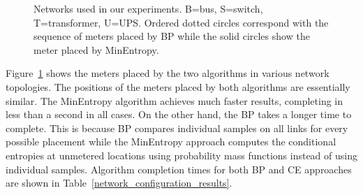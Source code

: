 \begin{figure}[!p]
\centering
{}

\begin{centering}
\end{centering}

\begin{centering}
\end{centering}

\begin{centering}
\end{centering}

\caption{Networks used in our experiments. B=bus, S=switch, T=transformer,
U=UPS. Ordered dotted circles correspond with the sequence of meters
placed by BP while the solid circles show the meter placed by MinEntropy.} 
\label{NetworkDiagrams}
\end{figure}

Figure~\ref{NetworkDiagrams} shows the meters placed by the two algorithms in various network topologies. The positions of the meters placed by both algorithms are essentially similar. The MinEntropy algorithm achieves much faster results, completing in less than a second in all cases. On the other hand, the BP takes a longer time to complete. This is because BP compares individual samples on all links for every possible placement while the MinEntropy approach computes the conditional entropies at unmetered locations using probability mass functions instead of using individual samples. Algorithm completion times for both BP and CE approaches are shown in Table~\ref{network_configuration_results}.

